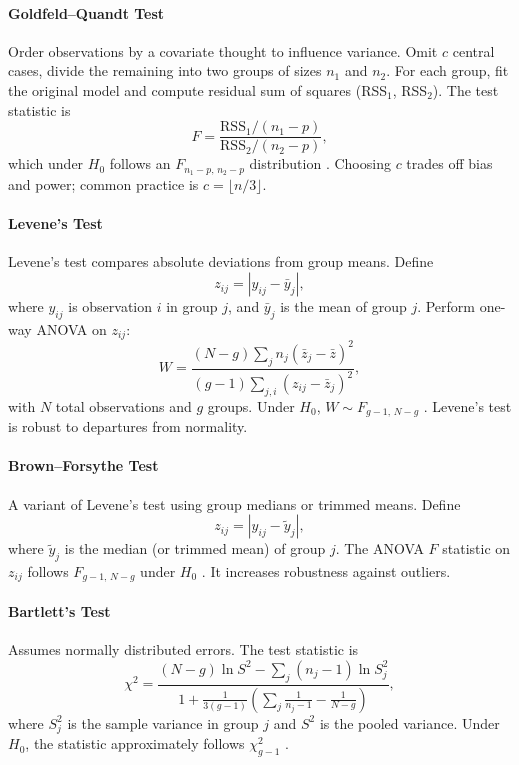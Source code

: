 \paragraph{Goldfeld–Quandt Test}\label{sec:goldfeld-detailed}
Order observations by a covariate thought to influence variance. Omit $c$ central cases, divide the remaining into two groups of sizes $n_1$ and $n_2$. For each group, fit the original model and compute residual sum of squares (RSS$_1$, RSS$_2$). The test statistic is
\[ F = \frac{\mathrm{RSS}_1/(n_1-p)}{\mathrm{RSS}_2/(n_2-p)},\]
which under $H_0$ follows an $F_{n_1-p,\,n_2-p}$ distribution \citep{goldfeld1965tests}. Choosing $c$ trades off bias and power; common practice is $c= \lfloor n/3 \rfloor$.  

\paragraph{Levene’s Test}\label{sec:levene-detailed}
Levene’s test compares absolute deviations from group means. Define
\[ z_{ij} = |y_{ij} - \bar y_j|, \]
where $y_{ij}$ is observation $i$ in group $j$, and $\bar y_j$ is the mean of group $j$. Perform one-way ANOVA on $z_{ij}$:
\[ W = \frac{(N-g)\sum_j n_j(\bar z_j - \bar z)^2}{(g-1)\sum_{j,i}(z_{ij} - \bar z_j)^2}, \]
with $N$ total observations and $g$ groups. Under $H_0$, $W\sim F_{g-1,\,N-g}$ \citep{levene1960robust}. Levene’s test is robust to departures from normality.

\paragraph{Brown–Forsythe Test}\label{sec:brown-forsythe}
A variant of Levene’s test using group medians or trimmed means. Define
\[ z_{ij} = |y_{ij} - \tilde y_j|, \]
where $\tilde y_j$ is the median (or trimmed mean) of group $j$. The ANOVA $F$ statistic on $z_{ij}$ follows $F_{g-1,\,N-g}$ under $H_0$ \citep{brownforsythe1974centre}. It increases robustness against outliers.

\paragraph{Bartlett’s Test}\label{sec:bartlett}
Assumes normally distributed errors. The test statistic is
\[ 
  \chi^2 = \frac{ (N-g)\ln S^2 - \sum_j (n_j-1)\ln S_j^2 }{1 + \frac{1}{3(g-1)}\left(\sum_j \frac{1}{n_j-1} - \frac{1}{N-g}\right)},
\]
where $S_j^2$ is the sample variance in group $j$ and $S^2$ is the pooled variance. Under $H_0$, the statistic approximately follows $\chi^2_{g-1}$ \citep{bartlett1937properties}.


